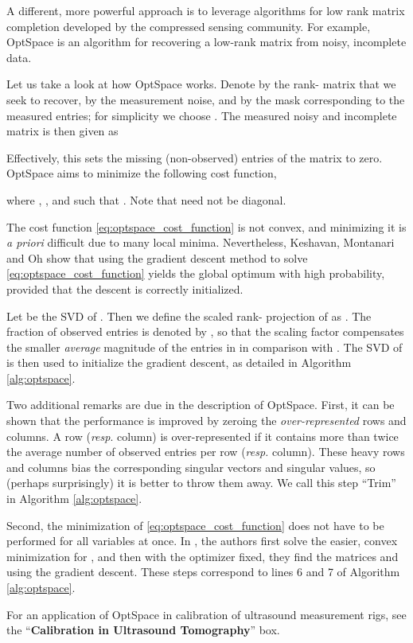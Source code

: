 \documentclass[10pt,double]{IEEEtran}
\newcommand{\rev}[1]{{#1}}
\begin{document}
A different, more powerful approach is to leverage algorithms for low rank
matrix completion developed by the compressed sensing community. For example,
OptSpace \cite{Keshavan:2010bt} is an algorithm for recovering a low-rank
matrix from noisy, incomplete data. \rev{Let us take a look at how OptSpace works.
Denote by  the rank- matrix that we seek to recover,
by  the measurement noise, and by  the mask corresponding to the measured entries; for simplicity we
choose . The measured noisy and incomplete matrix is then given as

Effectively, this sets the missing (non-observed) entries of the matrix to
zero. OptSpace aims to minimize the following cost function,

where , , and  such that . Note that  need
not be diagonal.

The cost function \eqref{eq:optspace_cost_function} is not convex, and
minimizing it is \emph{a priori} difficult \cite{Keshavan:2012tb} due to many
local minima. Nevertheless, Keshavan, Montanari and Oh \cite{Keshavan:2010bt}
show that using the gradient descent method to solve
\eqref{eq:optspace_cost_function} yields the global optimum with high
probability, provided that the descent is correctly initialized.

Let  be the SVD of
. Then we define the scaled rank- projection of  as
. The fraction of observed entries is denoted by , so
that the scaling factor compensates the smaller \emph{average} magnitude of
the entries in  in comparison with . The SVD of  is
then used to initialize the gradient descent, as detailed in Algorithm
\ref{alg:optspace}.

Two additional remarks are due in the description of OptSpace. First, it can
be shown that the performance is improved by zeroing the \emph{over-represented} rows and columns. A row (\emph{resp}. column) is over-represented
if it contains more than twice the average number of observed entries per row
(\emph{resp.} column). These heavy rows and columns bias the corresponding
singular vectors and singular values, so (perhaps surprisingly) it is better
to throw them away. We call this step ``Trim'' in Algorithm
\ref{alg:optspace}.

Second, the minimization of \eqref{eq:optspace_cost_function} does not have to
be performed for all variables at once. In \cite{Keshavan:2010bt}, the authors
first solve the easier, convex minimization for , and then with the
optimizer  fixed, they find the matrices  and  using the
gradient descent. These steps correspond to lines 6 and 7 of Algorithm
\ref{alg:optspace}.} For an application of OptSpace in calibration of
ultrasound measurement rigs, see the ``\textbf{Calibration in Ultrasound
Tomography}'' box.
\end{document}
